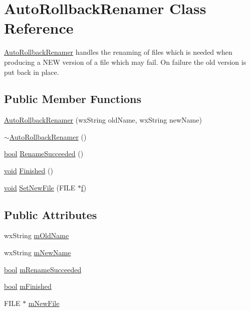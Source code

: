 \hypertarget{class_auto_rollback_renamer}{}\section{Auto\+Rollback\+Renamer Class Reference}
\label{class_auto_rollback_renamer}


\hyperlink{class_auto_rollback_renamer}{Auto\+Rollback\+Renamer} handles the renaming of files which is needed when producing a N\+EW version of a file which may fail. On failure the old version is put back in place.  


\subsection*{Public Member Functions}
\begin{DoxyCompactItemize}
\item 
\hyperlink{class_auto_rollback_renamer_a32e97854a288431814f1b1b64ba1fa94}{Auto\+Rollback\+Renamer} (wx\+String old\+Name, wx\+String new\+Name)
\item 
\hyperlink{class_auto_rollback_renamer_a8ecdc73850364fd757c8291a6392b101}{$\sim$\+Auto\+Rollback\+Renamer} ()
\item 
\hyperlink{mac_2config_2i386_2lib-src_2libsoxr_2soxr-config_8h_abb452686968e48b67397da5f97445f5b}{bool} \hyperlink{class_auto_rollback_renamer_a0eea2caadd371ab028d961c32c839d7f}{Rename\+Succeeded} ()
\item 
\hyperlink{sound_8c_ae35f5844602719cf66324f4de2a658b3}{void} \hyperlink{class_auto_rollback_renamer_a5dd7804a20a5c1cc722e23b4a6275751}{Finished} ()
\item 
\hyperlink{sound_8c_ae35f5844602719cf66324f4de2a658b3}{void} \hyperlink{class_auto_rollback_renamer_aba90cbcfb1f36f83ce4138cc1d624e20}{Set\+New\+File} (F\+I\+LE $\ast$\hyperlink{checksum_8c_ae747d72a1a803f5ff4a4b2602857d93b}{f})
\end{DoxyCompactItemize}
\subsection*{Public Attributes}
\begin{DoxyCompactItemize}
\item 
wx\+String \hyperlink{class_auto_rollback_renamer_a59d9d4f405559ec61ae6cb9f2cd79fa1}{m\+Old\+Name}
\item 
wx\+String \hyperlink{class_auto_rollback_renamer_a195879821551f3faa08be065b4b18195}{m\+New\+Name}
\item 
\hyperlink{mac_2config_2i386_2lib-src_2libsoxr_2soxr-config_8h_abb452686968e48b67397da5f97445f5b}{bool} \hyperlink{class_auto_rollback_renamer_a52144544ccb22ec75e664dd88e5e4120}{m\+Rename\+Succeeded}
\item 
\hyperlink{mac_2config_2i386_2lib-src_2libsoxr_2soxr-config_8h_abb452686968e48b67397da5f97445f5b}{bool} \hyperlink{class_auto_rollback_renamer_aaf57119c698b2ed46df50eaf42e36310}{m\+Finished}
\item 
F\+I\+LE $\ast$ \hyperlink{class_auto_rollback_renamer_a44b45b1af2942a4bf6e97a15aa55e55c}{m\+New\+File}
\end{DoxyCompactItemize}


